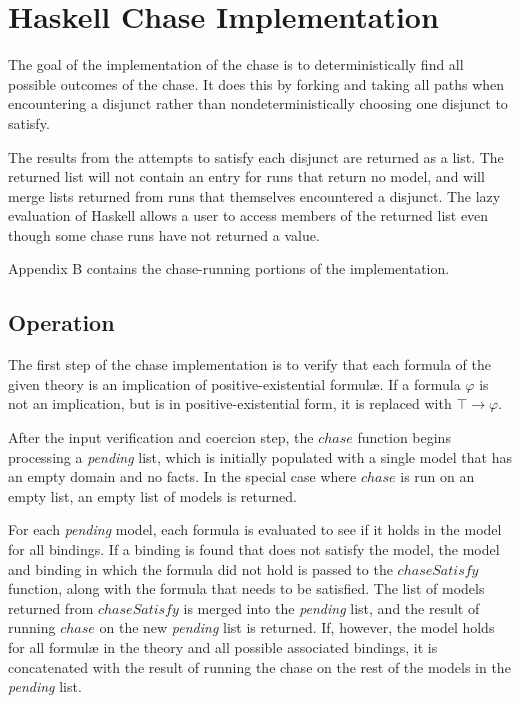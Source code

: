 \section{Haskell Chase Implementation}

	The goal of the implementation of the chase is to deterministically find
	all possible outcomes of the chase. It does this by forking and taking all
	paths when encountering a disjunct rather than nondeterministically
	choosing one disjunct to satisfy.

	The results from the attempts to satisfy each disjunct are returned as a
	list. The returned list will not contain an entry for runs that return no
	model, and will merge lists returned from runs that themselves encountered
	a disjunct. The lazy evaluation of Haskell allows a user to access members
	of the returned list even though some chase runs have not returned a value.

	Appendix B contains the chase-running portions of the implementation.

	\subsection{Operation}

	The first step of the chase implementation is to verify that each formula
	of the given theory is an implication of positive-existential formul{\ae}.
	If a formula $\varphi$ is not an implication, but is in
	positive-existential form, it is replaced with $\top \to \varphi$.

	After the input verification and coercion step, the $chase$ function begins
	processing a \emph{pending} list, which is initially populated with a
	single model that has an empty domain and no facts. In the special case
	where $chase$ is run on an empty list, an empty list of models is returned.

	For each \emph{pending} model, each formula is evaluated to see if it holds
	in the model for all bindings.  If a binding is found that does not satisfy
	the model, the model and binding in which the formula did not hold is
	passed to the $chaseSatisfy$ function, along with the formula that needs to
	be satisfied.  The list of models returned from $chaseSatisfy$ is merged
	into the \emph{pending} list, and the result of running $chase$ on the new
	\emph{pending} list is returned.  If, however, the model holds for all
	formul{\ae} in the theory and all possible associated bindings, it is
	concatenated with the result of running the chase on the rest of the models
	in the \emph{pending} list.

